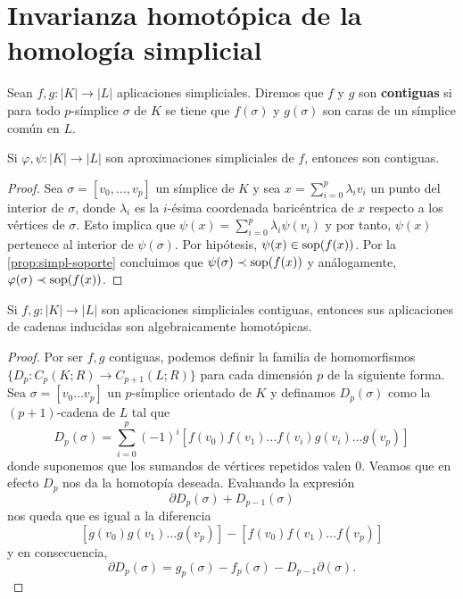 \section{Invarianza homotópica de la homología simplicial}
\begin{definicion}
	Sean $f,g : |K| \to |L|$ aplicaciones simpliciales. Diremos que $f$ y $g$ son \textbf{contiguas} si para todo $p$-símplice $\sigma$ de $K$ se tiene que $f(\sigma)$ y $g(\sigma)$ son caras de un símplice común en $L$.
\end{definicion}
\begin{lema}
	\label{lem:approx-simpl-contig}
	Si $\varphi, \psi : |K| \to |L|$ son aproximaciones simpliciales de $f$, entonces son contiguas.
\end{lema}
\begin{proof}
	Sea $\sigma =[ v_0, \dots, v_p]$ un símplice de $K$ y sea $x = \sum_{i=0}^p \lambda_i v_i$ un punto del interior de $\sigma$, donde $\lambda_i$ es la $i$-ésima coordenada baricéntrica de $x$ respecto a los vértices de $\sigma$. Esto implica que $\psi(x) = \sum_{i=0}^p \lambda_i \psi(v_i)$ y por tanto, $\psi(x)$ pertenece al interior de $\psi(\sigma)$. Por hipótesis, $\psi(x) \in \operatorname{sop}(f(x))$. Por la \autoref{prop:simpl-soporte} concluimos que $\psi(\sigma) \prec \operatorname{sop}(f(x))$ y análogamente, $\varphi(\sigma) \prec \operatorname{sop}(f(x))$.
\end{proof}
\begin{lema}
	\label{lem:contig-homotopy}
	Si $f,g : |K| \to |L|$ son aplicaciones simpliciales contiguas, entonces sus aplicaciones de cadenas inducidas son algebraicamente homotópicas.
\end{lema}
\begin{proof}
	Por ser $f,g$ contiguas, podemos definir la familia de homomorfismos $\{D_p : C_p(K;R) \to C_{p+1}(L;R)\}$ para cada dimensión $p$ de la siguiente forma. Sea $\sigma = [v_0\dots v_p]$ un $p$-símplice orientado de $K$ y definamos $D_p(\sigma)$  como la $(p+1)$-cadena de $L$ tal que
	\[
		D_p(\sigma) = \sum_{i=0}^p (-1)^i [f(v_0) f(v_1) \dots f(v_i) g(v_i) \dots g(v_p)]
	\]
	donde suponemos que los sumandos de vértices repetidos valen $0$. Veamos que en efecto $D_p$ nos da la homotopía deseada. Evaluando la expresión
	\[
		\partial D_p(\sigma) + D_{p-1}(\sigma)
	\]
	nos queda que es igual a la diferencia
	\[
		[g(v_0) g(v_1)\dots g(v_p)] - [f(v_0) f(v_1) \dots f(v_p)]
	\]
	y en consecuencia,
	\[
		\partial D_p(\sigma) = g_p(\sigma) - f_p(\sigma) - D_{p-1} \partial(\sigma).
	\]
\end{proof}

